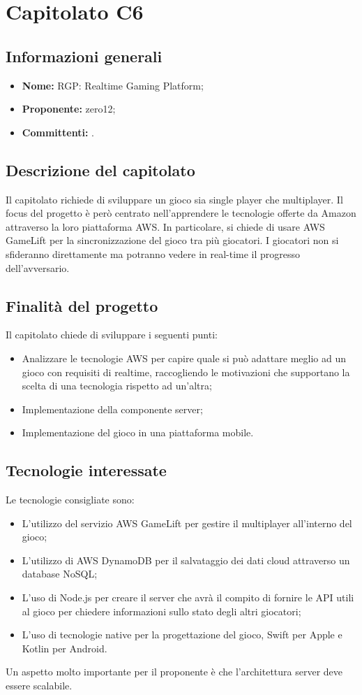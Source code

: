 \section{Capitolato C6}

\subsection{Informazioni generali}
\begin{itemize}
\item \textbf{Nome:} RGP: Realtime Gaming Platform;
\item \textbf{Proponente:} zero12;
\item \textbf{Committenti:} \committenti{}.
\end{itemize}

\subsection{Descrizione del capitolato}
Il capitolato richiede di sviluppare un gioco sia single player che multiplayer.
Il focus del progetto è però centrato nell'apprendere le tecnologie offerte da Amazon attraverso la loro piattaforma AWS.
In particolare, si chiede di usare AWS GameLift per la sincronizzazione del gioco tra più giocatori.
I giocatori non si sfideranno direttamente ma potranno vedere in real-time il progresso dell'avversario.

\subsection{Finalità del progetto}
Il capitolato chiede di sviluppare i seguenti punti:
\begin{itemize}
\item Analizzare le tecnologie AWS per capire quale si può adattare meglio ad un gioco con requisiti di realtime, raccogliendo le motivazioni che supportano la scelta di una tecnologia rispetto ad un'altra;
\item Implementazione della componente server;
\item Implementazione del gioco in una piattaforma mobile.
\end{itemize}

\subsection{Tecnologie interessate}
Le tecnologie consigliate sono:
\begin{itemize}
\item L'utilizzo del servizio AWS GameLift per gestire il multiplayer all'interno del gioco;
\item L'utilizzo di AWS DynamoDB per il salvataggio dei dati cloud attraverso un database NoSQL;
\item L'uso di Node.js per creare il server che avrà il compito di fornire le API utili al gioco per chiedere informazioni sullo stato degli altri giocatori;
\item L'uso di tecnologie native per la progettazione del gioco, Swift per Apple e Kotlin per Android.
\end{itemize}
Un aspetto molto importante per il proponente è che l'architettura server deve essere scalabile.

